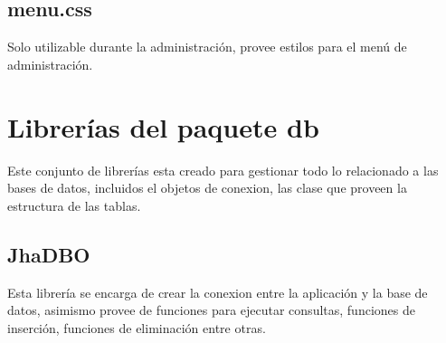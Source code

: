 \subsection{menu.css}
Solo utilizable durante la administraci\'on, provee estilos para el men\'u de administraci\'on.

\section{Librer\'ias del paquete \textsf{db}}
Este conjunto de librer\'ias esta creado para gestionar todo lo relacionado a las bases de datos, incluidos el objetos de conexion, las clase que proveen la estructura de las tablas.
\subsection{JhaDBO}
Esta librer\'ia se encarga de crear la conexion entre la aplicaci\'on y la base de datos, asimismo provee de funciones para ejecutar consultas, funciones de inserci\'on, funciones de eliminaci\'on entre otras.
